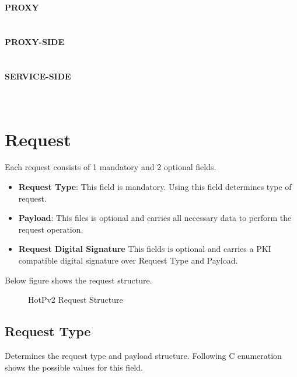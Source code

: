 \documentclass[10pt,a4paper]{article}
\begin{document}
  \textbf {PROXY} \\  \\\\
  \textbf {PROXY-SIDE} \\  \\\\
  \textbf {SERVICE-SIDE} \\  \\\\

\section {Request}
Each request consists of 1 mandatory and 2 optional fields.
\begin{itemize}
  \item \textbf{Request Type}: This field is mandatory. Using this field determines type of request.
  \item \textbf{Payload}: This files is optional and carries all necessary data to perform the request operation.
  \item \textbf{Request Digital Signature} This fields is optional and carries a PKI compatible digital signature over Request Type and Payload.
\end{itemize} 
Below figure shows the request structure.

\begin{figure}[!ht]
  \caption{HotPv2 Request Structure}
  \centering
\end{figure}

\subsection {Request Type}
Determines the request type and payload structure. Following C enumeration shows the possible values for this field.
\end{document}
